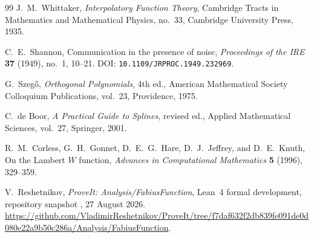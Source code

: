 \documentclass[11pt,oneside]{article}
\theoremstyle{definition}
\begin{document}
\begin{thebibliography}{99}
J.~M.~Whittaker,
\newblock \emph{Interpolatory Function Theory},
\newblock Cambridge Tracts in Mathematics and Mathematical Physics, no.~33,
  Cambridge University Press, 1935.

C.~E.~Shannon,
\newblock Communication in the presence of noise,
\newblock \emph{Proceedings of the IRE} \textbf{37} (1949), no.~1, 10--21.
\newblock DOI: \nolinkurl{10.1109/JRPROC.1949.232969}.

G.~Szegő,
\newblock \emph{Orthogonal Polynomials}, 4th ed.,
\newblock American Mathematical Society Colloquium Publications, vol.~23,
  Providence, 1975.

C.~de Boor,
\newblock \emph{A Practical Guide to Splines}, revised ed.,
\newblock Applied Mathematical Sciences, vol.~27, Springer, 2001.

R.~M.~Corless, G.~H.~Gonnet, D.~E.~G.~Hare, D.~J.~Jeffrey, and D.~E.~Knuth,
\newblock On the Lambert $W$ function,
\newblock \emph{Advances in Computational Mathematics}
  \textbf{5} (1996), 329--359.

V.~Reshetnikov,
\newblock \emph{ProveIt: Analysis/FabiusFunction},
\newblock Lean~4 formal development, repository snapshot
, 27 August 2026.
\newblock \url{https://github.com/VladimirReshetnikov/ProveIt/tree/f7daf632f2db839fe091de0d080e22a9b50c286a/Analysis/FabiusFunction}.

\end{thebibliography}
\end{document}
